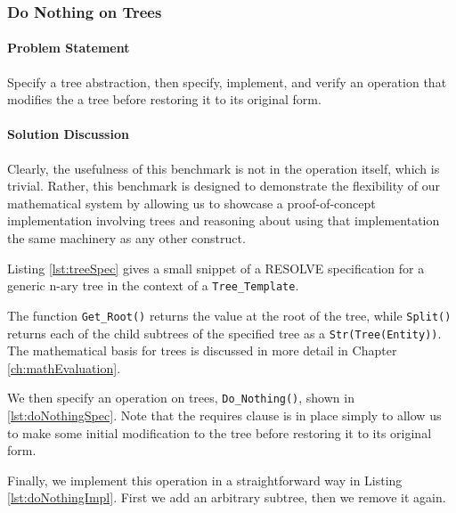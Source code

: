 \FloatBarrier
		\subsubsection{Do Nothing on Trees}	
\paragraph{Problem Statement}Specify a tree abstraction, then specify, implement, and verify an operation that modifies the a tree before restoring it to its original form.

\paragraph{Solution Discussion}Clearly, the usefulness of this benchmark is not in the operation itself, which is trivial.  Rather, this benchmark is designed to demonstrate the flexibility of our mathematical system by allowing us to showcase a proof-of-concept implementation involving trees and reasoning about using that implementation the same machinery as any other construct.

Listing \ref{lst:treeSpec} gives a small snippet of a RESOLVE specification for a generic n-ary tree in the context of a \texttt{Tree\_Template}.



The function \texttt{Get\_Root()} returns the value at the root of the tree, while \texttt{Split()} returns each of the child subtrees of the specified tree as a \texttt{Str(Tree(Entity))}.  The mathematical basis for trees is discussed in more detail in Chapter \ref{ch:mathEvaluation}.

We then specify an operation on trees, \texttt{Do\_Nothing()}, shown in \ref{lst:doNothingSpec}.  Note that the requires clause is in place simply to allow us to make some initial modification to the tree before restoring it to its original form.



Finally, we implement this operation in a straightforward way in Listing \ref{lst:doNothingImpl}.  First we add an arbitrary subtree, then we remove it again.

